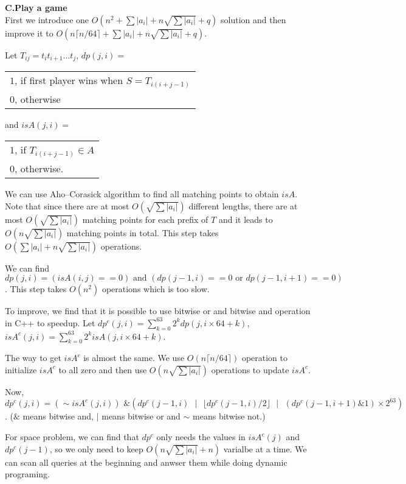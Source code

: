 \documentclass[14pt,a4paper]{article}
\begin{document}
{\Large \bf C.Play a game}\\

First we introduce one $O(n^2+\sum|a_i|+n\sqrt{\sum|a_i|}+q)$ solution and then improve it to $O(n\lceil n/64\rceil+\sum|a_i|+n\sqrt{\sum|a_i|}+q)$. 

\begin{minipage}{1\linewidth}
Let $T_{ij}=t_it_{i+1}\ldots t_j$, 
$dp(j,i)=$\begin{tabular}{l}$1$, if first player wins when $S=T_{i(i+j-1)}$ \\ $0$, otherwise \end{tabular}
and $isA(j,i)=$\begin{tabular}{l}$1$, if $T_{i(i+j-1)}\in A$ \\$0$, otherwise. \end{tabular}
\end{minipage}

We can use Aho–Corasick algorithm to find all matching points to obtain $isA$. 
Note that since there are at most $O(\sqrt{\sum|a_i|})$ different lengths, there are at most $O(\sqrt{\sum|a_i|})$ matching points for each prefix of $T$ 
and it leads to $O(n\sqrt{\sum|a_i|})$ matching points in total. This step takes $O(\sum|a_i|+n\sqrt{\sum|a_i|})$ operations.

We can find $dp(j,i)=(isA(i,j)==0) \text{ and } (dp(j-1,i)==0 \text{ or } dp(j-1,i+1)==0)$. This step takes $O(n^2)$ operations which is too slow.

To improve, we find that it is possible to use bitwise or and bitwise and operation in C++ to speedup. 
Let $dp^c(j,i)=\sum\limits_{k=0}^{63}2^kdp(j,i\times 64+k)$,  $isA^c(j,i)=\sum\limits_{k=0}^{63}2^kisA(j,i\times 64+k)$. 

The way to get $isA^c$ is almost the same. 
We use $O(n\lceil n/64\rceil)$ operation to initialize $isA^c$ to all zero and then use $O(n\sqrt{\sum|a_i|})$ operations to update $isA^c$. 

Now, $dp^c(j,i)=(\sim isA^c(j,i))\text{ \& }(dp^c(j-1,i)\text{ }|\text{ }\lfloor dp^c(j-1,i)/2\rfloor \text{ }|\text{ }(dp^c(j-1,i+1)\&1)\times 2^{63})$. 
($\&$ means bitwise and, $|$ means bitwise or and $\sim$ means bitwise not.) 

For space problem, we can find that $dp^c$ only needs the values in $isA^c(j)$ and $dp^c(j-1)$, so we only need to keep $O(n\sqrt{\sum|a_i|}+n)$ varialbe at a time.
We can scan all queries at the beginning and anwser them while doing dynamic programing. 
\\
\end{document}
